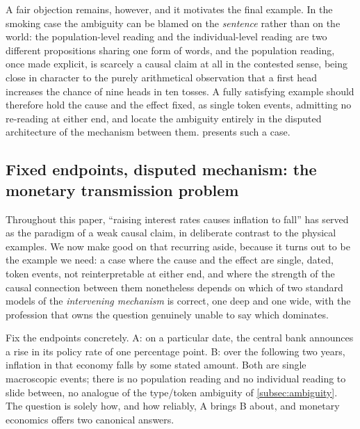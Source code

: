 \documentclass[11pt]{article}
\theoremstyle{definition}
\begin{document}
A fair objection remains, however, and it motivates the final example. In the smoking case the ambiguity can be blamed on the \emph{sentence} rather than on the world: the population-level reading and the individual-level reading are two different propositions sharing one form of words, and the population reading, once made explicit, is scarcely a causal claim at all in the contested sense, being close in character to the purely arithmetical observation that a first head increases the chance of nine heads in ten tosses. A fully satisfying example should therefore hold the cause and the effect fixed, as single token events, admitting no re-reading at either end, and locate the ambiguity entirely in the disputed architecture of the mechanism between them.  presents such a case.

\subsection{Fixed endpoints, disputed mechanism: the monetary transmission problem}
\label{subsec:transmission}

Throughout this paper, ``raising interest rates causes inflation to fall'' has served as the paradigm of a weak causal claim, in deliberate contrast to the physical examples. We now make good on that recurring aside, because it turns out to be the example we need: a case where the cause and the effect are single, dated, token events, not reinterpretable at either end, and where the strength of the causal connection between them nonetheless depends on which of two standard models of the \emph{intervening mechanism} is correct, one deep and one wide, with the profession that owns the question genuinely unable to say which dominates.

Fix the endpoints concretely. A: on a particular date, the central bank announces a rise in its policy rate of one percentage point. B: over the following two years, inflation in that economy falls by some stated amount. Both are single macroscopic events; there is no population reading and no individual reading to slide between, no analogue of the type/token ambiguity of \cref{subsec:ambiguity}. The question is solely how, and how reliably, A brings B about, and monetary economics offers two canonical answers.
\end{document}

